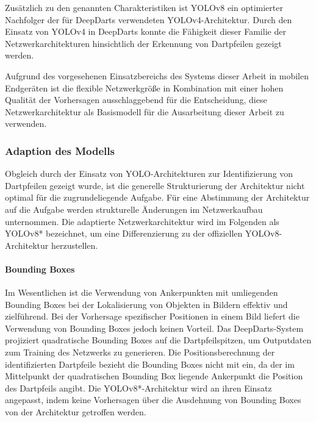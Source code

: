 Zusätzlich zu den genannten Charakteristiken ist YOLOv8 ein optimierter Nachfolger der für DeepDarts verwendeten YOLOv4-Architektur. Durch den Einsatz von YOLOv4 in DeepDarts konnte die Fähigkeit dieser Familie der Netzwerkarchitekturen hinsichtlich der Erkennung von Dartpfeilen gezeigt werden.

Aufgrund des vorgesehenen Einsatzbereichs des Systems dieser Arbeit in mobilen Endgeräten ist die flexible Netzwerkgröße in Kombination mit einer hohen Qualität der Vorhersagen ausschlaggebend für die Entscheidung, diese Netzwerkarchitektur als Basismodell für die Ausarbeitung dieser Arbeit zu verwenden.

\vspace*{-0.12cm}
\subsubsection{Adaption des Modells}
\label{sec:yolo_adaption}

Obgleich durch \citeauthor{deepdarts} der Einsatz von YOLO-Architekturen zur Identifizierung von Dartpfeilen gezeigt wurde, ist die generelle Strukturierung der Architektur nicht optimal für die zugrundeliegende Aufgabe. Für eine Abstimmung der Architektur auf die Aufgabe werden strukturelle Änderungen im Netzwerkaufbau unternommen. Die adaptierte Netzwerkarchitektur wird im Folgenden als YOLOv8* bezeichnet, um eine Differenzierung zu der offiziellen YOLOv8-Architektur herzustellen.

\vspace*{-0.12cm}
\paragraph{Bounding Boxes}

Im Wesentlichen ist die Verwendung von Ankerpunkten mit umliegenden Bounding Boxes bei der Lokalisierung von Objekten in Bildern effektiv und zielführend. Bei der Vorhersage spezifischer Positionen in einem Bild liefert die Verwendung von Bounding Boxes jedoch keinen Vorteil. Das DeepDarts-System projiziert quadratische Bounding Boxes auf die Dartpfeilspitzen, um Outputdaten zum Training des Netzwerks zu generieren. Die Positionsberechnung der identifizierten Dartpfeile bezieht die Bounding Boxes nicht mit ein, da der im Mittelpunkt der quadratischen Bounding Box liegende Ankerpunkt die Position des Dartpfeils angibt. Die YOLOv8*-Architektur wird an ihren Einsatz angepasst, indem keine Vorhersagen über die Ausdehnung von Bounding Boxes von der Architektur getroffen werden.


